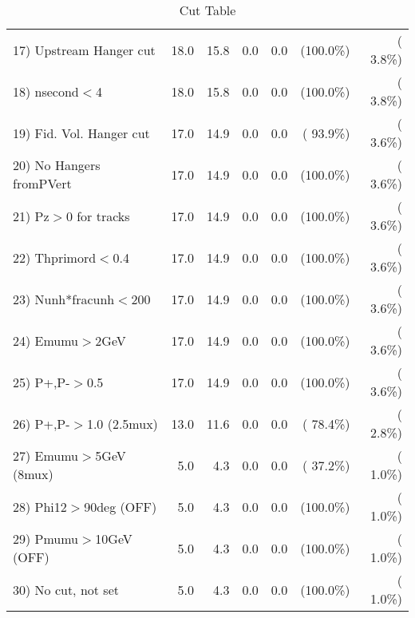 \begin{table}[h!]
\begin{tabular}{||l||r|r|r|r|r|r||}
 17) Upstream Hanger cut  &         18.0 &         15.8 &          0.0 &          0.0 & (100.0\%) & (  3.8\%) \\
 18) nsecond$<$4          &         18.0 &         15.8 &          0.0 &          0.0 & (100.0\%) & (  3.8\%) \\
 19) Fid. Vol. Hanger cut &         17.0 &         14.9 &          0.0 &          0.0 & ( 93.9\%) & (  3.6\%) \\
 20) No Hangers fromPVert &         17.0 &         14.9 &          0.0 &          0.0 & (100.0\%) & (  3.6\%) \\
 21) Pz$>$0 for tracks    &         17.0 &         14.9 &          0.0 &          0.0 & (100.0\%) & (  3.6\%) \\
 22) Thprimord$<$0.4      &         17.0 &         14.9 &          0.0 &          0.0 & (100.0\%) & (  3.6\%) \\
 23) Nunh*fracunh$<$200   &         17.0 &         14.9 &          0.0 &          0.0 & (100.0\%) & (  3.6\%) \\
 24) Emumu$>$2GeV         &         17.0 &         14.9 &          0.0 &          0.0 & (100.0\%) & (  3.6\%) \\
 25) P+,P-$>$0.5          &         17.0 &         14.9 &          0.0 &          0.0 & (100.0\%) & (  3.6\%) \\
 26) P+,P-$>$1.0 (2.5mux) &         13.0 &         11.6 &          0.0 &          0.0 & ( 78.4\%) & (  2.8\%) \\
 27) Emumu$>$5GeV  (8mux) &          5.0 &          4.3 &          0.0 &          0.0 & ( 37.2\%) & (  1.0\%) \\
 28) Phi12$>$90deg  (OFF) &          5.0 &          4.3 &          0.0 &          0.0 & (100.0\%) & (  1.0\%) \\
 29) Pmumu$>$10GeV  (OFF) &          5.0 &          4.3 &          0.0 &          0.0 & (100.0\%) & (  1.0\%) \\
 30) No cut, not set      &          5.0 &          4.3 &          0.0 &          0.0 & (100.0\%) & (  1.0\%) \\
 \hline
 \hline
 \end{tabular}
 \caption{Cut Table           }
 \label{tab-cutcohjpsi-mumu_jpsi}
 \end{table}
